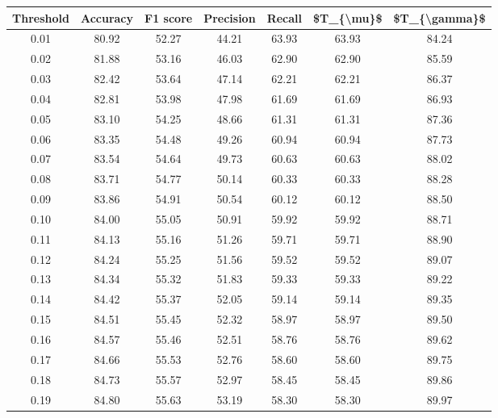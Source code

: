 \begin{tabular}{|c|c|c|c|c|c|c|}
\hline
 Threshold &  Accuracy &  F1 score &  Precision &  Recall &  \$T\_\{\textbackslash mu\}\$ &  \$T\_\{\textbackslash gamma\}\$ \\
\hline
      0.01 &     80.92 &     52.27 &      44.21 &   63.93 &      63.93 &         84.24 \\
      0.02 &     81.88 &     53.16 &      46.03 &   62.90 &      62.90 &         85.59 \\
      0.03 &     82.42 &     53.64 &      47.14 &   62.21 &      62.21 &         86.37 \\
      0.04 &     82.81 &     53.98 &      47.98 &   61.69 &      61.69 &         86.93 \\
      0.05 &     83.10 &     54.25 &      48.66 &   61.31 &      61.31 &         87.36 \\
      0.06 &     83.35 &     54.48 &      49.26 &   60.94 &      60.94 &         87.73 \\
      0.07 &     83.54 &     54.64 &      49.73 &   60.63 &      60.63 &         88.02 \\
      0.08 &     83.71 &     54.77 &      50.14 &   60.33 &      60.33 &         88.28 \\
      0.09 &     83.86 &     54.91 &      50.54 &   60.12 &      60.12 &         88.50 \\
      0.10 &     84.00 &     55.05 &      50.91 &   59.92 &      59.92 &         88.71 \\
      0.11 &     84.13 &     55.16 &      51.26 &   59.71 &      59.71 &         88.90 \\
      0.12 &     84.24 &     55.25 &      51.56 &   59.52 &      59.52 &         89.07 \\
      0.13 &     84.34 &     55.32 &      51.83 &   59.33 &      59.33 &         89.22 \\
      0.14 &     84.42 &     55.37 &      52.05 &   59.14 &      59.14 &         89.35 \\
      0.15 &     84.51 &     55.45 &      52.32 &   58.97 &      58.97 &         89.50 \\
      0.16 &     84.57 &     55.46 &      52.51 &   58.76 &      58.76 &         89.62 \\
      0.17 &     84.66 &     55.53 &      52.76 &   58.60 &      58.60 &         89.75 \\
      0.18 &     84.73 &     55.57 &      52.97 &   58.45 &      58.45 &         89.86 \\
      0.19 &     84.80 &     55.63 &      53.19 &   58.30 &      58.30 &         89.97 \\

\end{tabular}
